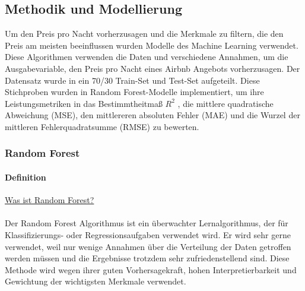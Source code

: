 \documentclass[12pt]{article}
\begin{document}
\begin{text}
\newpage
\part{Methodik und Modellierung}

Um den Preis pro Nacht vorherzusagen und die Merkmale zu filtern, die den Preis am meisten beeinflussen wurden Modelle des Machine Learning verwendet. Diese Algorithmen verwenden die Daten und verschiedene Annahmen, um die Ausgabevariable, den Preis pro Nacht eines Airbnb Angebots vorherzusagen. Der Datensatz wurde in ein 70/30 Train-Set und Test-Set aufgeteilt. Diese Stichproben wurden in Random Forest-Modelle implementiert, um ihre Leistungsmetriken in das Bestimmtheitmaß $R^2$ , die mittlere quadratische Abweichung (MSE), den mittlereren absoluten Fehler (MAE) und die Wurzel der mittleren Fehlerquadratsumme (RMSE) zu bewerten.

\section{Random Forest}
\subsection{Definition}
        \underline{Was ist Random Forest?}\\\\
Der Random Forest Algorithmus ist ein überwachter Lernalgorithmus, der für Klassifizierungs- oder Regressionsaufgaben verwendet wird. Er wird sehr gerne verwendet, weil nur wenige Annahmen über die Verteilung der Daten getroffen werden müssen und die Ergebnisse trotzdem sehr zufriedenstellend sind. Diese Methode wird wegen ihrer guten Vorhersagekraft, hohen Interpretierbarkeit und Gewichtung der wichtigsten Merkmale verwendet.
\\

\end{text}
\end{document}

